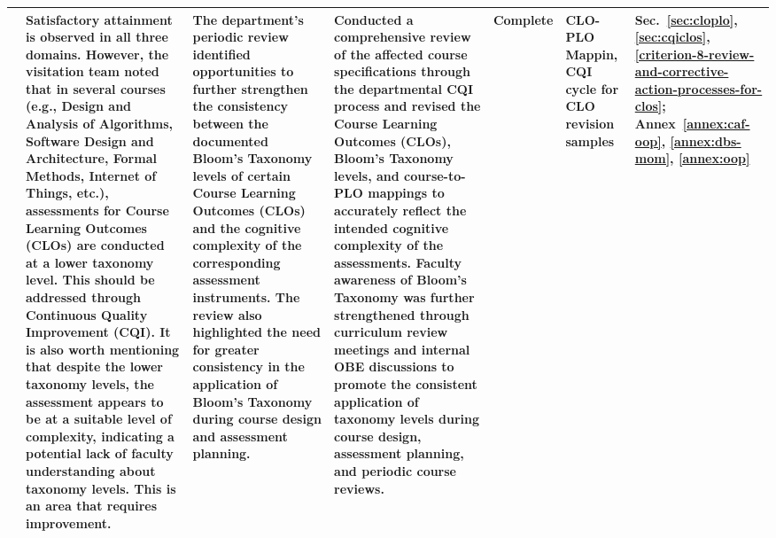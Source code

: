 \begin{landscape}
\begin{longtable}{|P{2.3cm}|P{5.0cm}|P{4.5cm}|P{5.0cm}|P{2.4cm}|P{2.8cm}|P{1.8cm}|}
 & Satisfactory attainment is observed in all three domains. However, the visitation team noted that in several courses (e.g., Design and Analysis of Algorithms, Software Design and Architecture, Formal Methods, Internet of Things, etc.), assessments for Course Learning Outcomes (CLOs) are conducted at a lower taxonomy level. This should be addressed through Continuous Quality Improvement (CQI). It is also worth mentioning that despite the lower taxonomy levels, the assessment appears to be at a suitable level of complexity, indicating a potential lack of faculty understanding about taxonomy levels. This is an area that requires improvement. & The department's periodic review identified opportunities to further strengthen the consistency between the documented Bloom's Taxonomy levels of certain Course Learning Outcomes (CLOs) and the cognitive complexity of the corresponding assessment instruments. The review also highlighted the need for greater consistency in the application of Bloom's Taxonomy during course design and assessment planning. & Conducted a comprehensive review of the affected course specifications through the departmental CQI process and revised the Course Learning Outcomes (CLOs), Bloom's Taxonomy levels, and course-to-PLO mappings to accurately reflect the intended cognitive complexity of the assessments. Faculty awareness of Bloom's Taxonomy was further strengthened through curriculum review meetings and internal OBE discussions to promote the consistent application of taxonomy levels during course design, assessment planning, and periodic course reviews. & Complete & CLO-PLO Mappin, CQI cycle for CLO revision samples & Sec.~\ref{sec:cloplo}, \ref{sec:cqiclos}, \ref{criterion-8-review-and-corrective-action-processes-for-clos}; Annex~\ref{annex:caf-oop}, \ref{annex:dbs-mom}, \ref{annex:oop} \\ \hline

\end{longtable}
\end{landscape}
